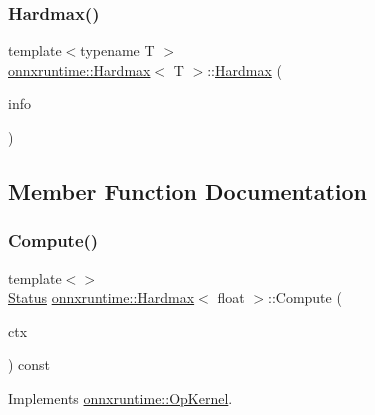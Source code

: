 \subsubsection{\texorpdfstring{Hardmax()}{Hardmax()}}
{\footnotesize\ttfamily template$<$typename T $>$ \\
\mbox{\hyperlink{classonnxruntime_1_1Hardmax}{onnxruntime\+::\+Hardmax}}$<$ T $>$\+::\mbox{\hyperlink{classonnxruntime_1_1Hardmax}{Hardmax}} (\begin{DoxyParamCaption}\item[{const \mbox{\hyperlink{classonnxruntime_1_1OpKernelInfo}{Op\+Kernel\+Info}} \&}]{info }\end{DoxyParamCaption})\hspace{0.3cm}{\ttfamily [inline]}}



\subsection{Member Function Documentation}
\mbox{\label{classonnxruntime_1_1Hardmax_a2ece131739b253c2d06d655a1c923124}} 
\subsubsection{\texorpdfstring{Compute()}{Compute()}\hspace{0.1cm}{\footnotesize\ttfamily [1/2]}}
{\footnotesize\ttfamily template$<$$>$ \\
\mbox{\hyperlink{classonnxruntime_1_1common_1_1Status}{Status}} \mbox{\hyperlink{classonnxruntime_1_1Hardmax}{onnxruntime\+::\+Hardmax}}$<$ float $>$\+::Compute (\begin{DoxyParamCaption}\item[{\mbox{\hyperlink{classonnxruntime_1_1OpKernelContext}{Op\+Kernel\+Context}} $\ast$}]{ctx }\end{DoxyParamCaption}) const\hspace{0.3cm}{\ttfamily [virtual]}}



Implements \mbox{\hyperlink{classonnxruntime_1_1OpKernel_a9eca8656a78b1b3ab9d3351a12798650}{onnxruntime\+::\+Op\+Kernel}}.

\mbox{\label{classonnxruntime_1_1Hardmax_a28b0fa9d4aa2b1ae9e0b2b1f49a6525d}} 
